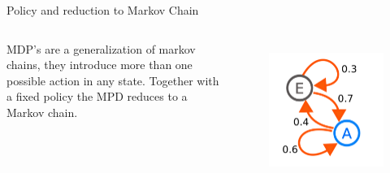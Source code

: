 \documentclass{beamer}
\begin{document}
\begin{frame}{Policy and reduction to Markov Chain}

	\begin{columns}

MDP's are a generalization of markov chains, they introduce more than one possible action in any state. Together with a fixed policy the MPD reduces to a Markov chain.


	\begin{figure}
	\centering
	\includegraphics[width=\linewidth]{Images/markov_chain.png}\\
	\end{figure}

	\end{columns}

\end{frame}
\end{document}
